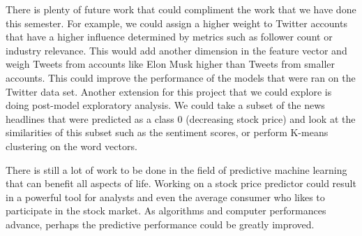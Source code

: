\documentclass[conference]{IEEEtran}
\begin{document}
There is plenty of future work that could compliment the work that we have done this semester. For example, we could assign a higher weight to Twitter accounts that have a higher influence determined by metrics such as follower count or industry relevance. This would add another dimension in the feature vector and weigh Tweets from accounts like Elon Musk higher than Tweets from smaller accounts. This could improve the performance of the models that were ran on the Twitter data set. Another extension for this project that we could explore is doing post-model exploratory analysis. We could take a subset of the news headlines that were predicted as a class 0 (decreasing stock price) and look at the similarities of this subset such as the sentiment scores, or perform K-means clustering on the word vectors.

There is still a lot of work to be done in the field of predictive machine learning that can benefit all aspects of life. Working on a stock price predictor could result in a powerful tool for analysts and even the average consumer who likes to participate in the stock market. As algorithms and computer performances advance, perhaps the predictive performance could be greatly improved. 
\end{document}
